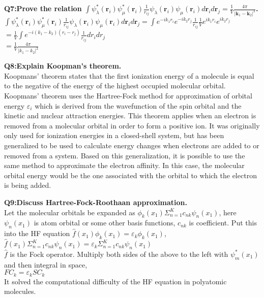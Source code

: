 \documentclass{article}
\begin{document}
\newpage
\noindent \textbf{Q7:Prove the relation $\int\psi^*_\lambda(\textbf{r}_i)\psi^*_\mu(\textbf{r}_i)\frac{1}{r_{ij}}\psi_\lambda(\textbf{r}_i)\psi_\mu(\textbf{r}_i)d\textbf{r}_id\textbf{r}_j=\frac{1}{V}\frac{4\pi}{\lvert\textbf{k}_1-\textbf{k}_2\rvert^2}$.}\\
\noindent $\int\psi^*_\lambda(\textbf{r}_i)\psi^*_\mu(\textbf{r}_i)\frac{1}{r_{ij}}\psi_\lambda(\textbf{r}_i)\psi_\mu(\textbf{r}_i)d\textbf{r}_id\textbf{r}_j=\int e^{-ik_1r_i}e^{-ik_2r_j}\frac{1}{r_{ij}}\frac{1}{V}e^{ik_1r_i}e^{ik_2r_j}$\\
\noindent $=\frac{1}{V}\int e^{-i(k_1-k_2)(r_i-r_j)}\frac{1}{r_{ij}}dr_idr_j$\\
\noindent $=\frac{1}{V}\frac{4\pi}{\lvert k_1-k_2\rvert^2}$


\newpage
\noindent \textbf{Q8:Explain Koopman's theorem.}\\
\noindent Koopmans' theorem states that the first ionization energy of a molecule is equal to the negative of the energy of the highest occupied molecular orbital.\\
\noindent Koopmans' theorem uses the Hartree-Fock method for approximation of orbital energy $\varepsilon_i$ which is derived from the wavefunction of the spin orbital and the kinetic and nuclear attraction energies. This theorem applies when an electron is removed from a molecular orbital in order to form a positive ion. It was originally only used for ionization energies in a closed-shell system, but has been generalized to be used to calculate energy changes when electrons are added to or removed from a system. Based on this generalization, it is possible to use the same method to approximate the electron affinity. In this case, the molecular orbital energy would be the one associated with the orbital to which the electron is being added.


\newpage
\noindent \textbf{Q9:Discuss Hartree-Fock-Roothaan approximation.}\\
\noindent Let the molecular orbitals be expanded as $\phi_k{(x_1)}\Sigma^{K}_{n=1}c_{nk}\psi_n(x_1)$, here $\psi_n(x_1)$ is atom orbital or some other basis functions, $c_{nk}$ is coefficient. Put this into the HF equation $\hat{f}(x_1)\phi_k(x_1)=\varepsilon_k\phi_k(x_1)$, \\
\noindent $\hat{f}(x_1)\Sigma^{K}_{n=1}c_{nk}\psi_n(x_1)=\varepsilon_k\Sigma^{K}_{n=1}c_{nk}\psi_n(x_1)$\\
\noindent $\hat{f}$ is the Fock operator. Multiply both sides of the above to the left with $\psi^{*}_m(x_1)$ and then integral in space,\\
\noindent $FC_k=\varepsilon_kSC_k$\\
\noindent It solved the computational difficulty of the HF equation in polyatomic molecules.
\end{document}
